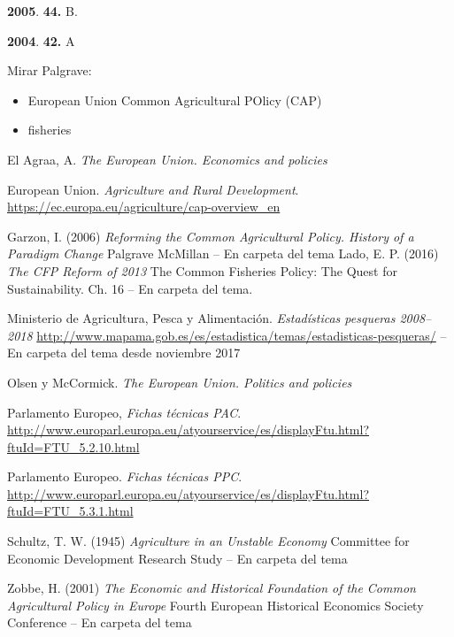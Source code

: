 \documentclass{nuevotema}
\begin{document}
\textbf{2005}. \textbf{44.} B.

\textbf{2004}. \textbf{42.} A


\bibliografia

Mirar Palgrave:
\begin{itemize}
	\item European Union Common Agricultural POlicy (CAP)
	\item fisheries
\end{itemize}

El Agraa, A. \textit{The European Union. Economics and policies}


European Union. \textit{Agriculture and Rural Development}. \url{https://ec.europa.eu/agriculture/cap-overview_en}

Garzon, I. (2006) \textit{Reforming the Common Agricultural Policy. History of a Paradigm Change} Palgrave McMillan -- En carpeta del tema
Lado, E. P. (2016) \textit{The CFP Reform of 2013} The Common Fisheries Policy: The Quest for Sustainability. Ch. 16 -- En carpeta del tema.

Ministerio de Agricultura, Pesca y Alimentación. \textit{Estadísticas pesqueras 2008--2018} \url{http://www.mapama.gob.es/es/estadistica/temas/estadisticas-pesqueras/} -- En carpeta del tema desde noviembre 2017

Olsen y McCormick. \textit{The European Union. Politics and policies}

Parlamento Europeo, \textit{Fichas técnicas PAC}. \url{http://www.europarl.europa.eu/atyourservice/es/displayFtu.html?ftuId=FTU_5.2.10.html}

Parlamento Europeo. \textit{Fichas técnicas PPC}. \url{http://www.europarl.europa.eu/atyourservice/es/displayFtu.html?ftuId=FTU_5.3.1.html}

Schultz, T. W. (1945) \textit{Agriculture in an Unstable Economy} Committee for Economic Development Research Study -- En carpeta del tema

Zobbe, H. (2001) \textit{The Economic and Historical Foundation of the Common Agricultural Policy in Europe} Fourth European Historical Economics Society Conference -- En carpeta del tema
\end{document}
